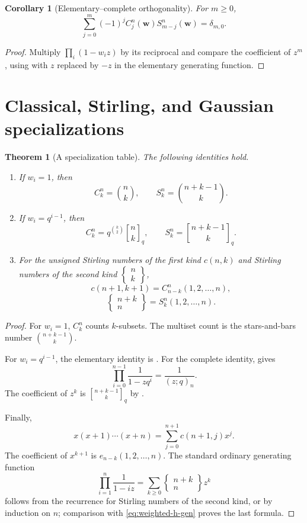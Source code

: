 \documentclass[11pt,oneside,openany]{book}
\newtheorem{theorem}{Theorem}[chapter]
\newtheorem{corollary}[corollary]{Corollary}
\theoremstyle{definition}
\theoremstyle{remark}
\newcommand{\qbinom}[2]{\genfrac{[}{]}{0pt}{}{#1}{#2}_{q}}
\begin{document}
\begin{corollary}[Elementary--complete orthogonality]\label{cor:e-h-orthogonality}
For $m\ge0$,
\[
 \sum_{j=0}^{m}(-1)^jC_j^n(\mathbf w)S_{m-j}^n(\mathbf w)=\delta_{m,0}.
\]
\end{corollary}

\begin{proof}
Multiply
\(
 \prod_i(1-w_i z)
\)
by its reciprocal and compare the coefficient of $z^m$, using  with $z$ replaced by $-z$ in the elementary generating function.
\end{proof}

\section{Classical, Stirling, and Gaussian specializations}

\begin{theorem}[A specialization table]\label{thm:weighted-specializations}
The following identities hold.
\begin{enumerate}[label=\textup{(\roman*)}]
\item If $w_i=1$, then
\[
 C_k^n=\binom nk,
 \qquad
 S_k^n=\binom{n+k-1}{k}.
\]
\item If $w_i=q^{i-1}$, then
\[
 C_k^n=q^{\binom k2}\qbinom nk,
 \qquad
 S_k^n=\qbinom{n+k-1}{k}.
\]
\item For the unsigned Stirling numbers of the first kind $c(n,k)$ and Stirling numbers of the second kind $\left\{\begin{smallmatrix}n\\k\end{smallmatrix}\right\}$,
\[
 c(n+1,k+1)=C_{n-k}^{n}(1,2,\dots,n),
\]
\[
 \left\{\begin{matrix}n+k\\n\end{matrix}\right\}
 =S_k^n(1,2,\dots,n).
\]
\end{enumerate}
\end{theorem}

\begin{proof}
For $w_i=1$, $C_k^n$ counts $k$-subsets.  The multiset count is the stars-and-bars number $\binom{n+k-1}{k}$.

For $w_i=q^{i-1}$, the elementary identity is .  For the complete identity,  gives
\[
 \prod_{i=0}^{n-1}\frac1{1-zq^i}
 =\frac1{(z;q)_n}.
\]
The coefficient of $z^k$ is $\qbinom{n+k-1}{k}$ by .

Finally,
\[
 x(x+1)\cdots(x+n)=\sum_{j=0}^{n+1}c(n+1,j)x^j.
\]
The coefficient of $x^{k+1}$ is $e_{n-k}(1,2,\dots,n)$.  The standard ordinary generating function
\[
 \prod_{i=1}^{n}\frac1{1-iz}
 =\sum_{k\ge0}\left\{\begin{matrix}n+k\\n\end{matrix}\right\}z^k
\]
follows from the recurrence for Stirling numbers of the second kind, or by induction on $n$; comparison with \eqref{eq:weighted-h-gen} proves the last formula.
\end{proof}
\end{document}
